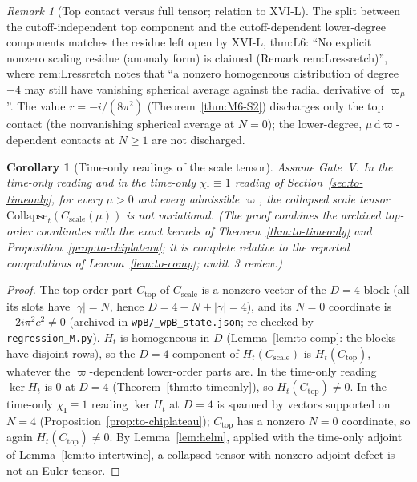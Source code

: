 \documentclass{article}
\newtheorem{corollary}[proposition]{Corollary}
\theoremstyle{remark}
\newtheorem{remark}[proposition]{Remark}
\newcommand{\chiI}{\chi_{\mathrm I}}
\newcommand{\Coll}{\mathrm{Collapse}}
\begin{document}
\begin{remark}[Top contact versus full tensor; relation to XVI-L]
\label{rem:wpB-topfull}
The split between the cutoff-independent top component and the cutoff-dependent lower-degree components matches the residue left open by XVI-L, thm:L6: ``No explicit nonzero scaling residue (anomaly form) is claimed (Remark rem:Lressretch)'', where rem:Lressretch notes that ``a nonzero homogeneous distribution of degree \(-4\) may still have vanishing spherical average against the radial derivative of \(\varpi_\mu\)''.
The value $r=-i/(8\pi^2)$ (Theorem~\ref{thm:M6-S2}) discharges only the top contact (the nonvanishing spherical average at $N=0$); the lower-degree, $\mu\,\mathrm d\varpi$-dependent contacts at $N\ge1$ are not discharged.
\end{remark}

\begin{corollary}[Time-only readings of the scale tensor]
\label{cor:wpB-timeonly}
Assume Gate~V.
In the time-only reading and in the time-only $\chiI\equiv1$ reading of Section~\ref{sec:to-timeonly}, for every $\mu>0$ and every admissible $\varpi$, the collapsed scale tensor $\Coll_t(C_{\mathrm{scale}}(\mu))$ is not variational.
(The proof combines the archived top-order coordinates with the exact kernels of Theorem~\ref{thm:to-timeonly} and Proposition~\ref{prop:to-chiplateau}; it is complete relative to the reported computations of Lemma~\ref{lem:to-comp}; audit~3 review.)
\end{corollary}
\begin{proof}
The top-order part $C_{\mathrm{top}}$ of $C_{\mathrm{scale}}$ is a nonzero vector of the $D=4$ block (all its slots have $|\gamma|=N$, hence $D=4-N+|\gamma|=4$), and its $N=0$ coordinate is $-2i\pi^2c^2\neq0$ (archived in \texttt{wpB/\_wpB\_state.json}; re-checked by \texttt{regression\_M.py}).
$H_t$ is homogeneous in $D$ (Lemma~\ref{lem:to-comp}: the blocks have disjoint rows), so the $D=4$ component of $H_t(C_{\mathrm{scale}})$ is $H_t(C_{\mathrm{top}})$, whatever the $\varpi$-dependent lower-order parts are.
In the time-only reading $\ker H_t$ is $0$ at $D=4$ (Theorem~\ref{thm:to-timeonly}), so $H_t(C_{\mathrm{top}})\neq0$.
In the time-only $\chiI\equiv1$ reading $\ker H_t$ at $D=4$ is spanned by vectors supported on $N=4$ (Proposition~\ref{prop:to-chiplateau}); $C_{\mathrm{top}}$ has a nonzero $N=0$ coordinate, so again $H_t(C_{\mathrm{top}})\neq0$.
By Lemma~\ref{lem:helm}, applied with the time-only adjoint of Lemma~\ref{lem:to-intertwine}, a collapsed tensor with nonzero adjoint defect is not an Euler tensor.
\end{proof}
\end{document}
